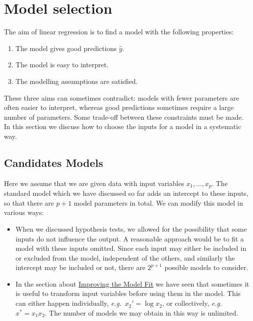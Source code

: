 \documentclass[
  a4paper,
]{article}
\providecommand{\tightlist}{%
  \setlength{\itemsep}{0pt}\setlength{\parskip}{0pt}}
\theoremstyle{definition}
\theoremstyle{definition}
\theoremstyle{definition}
\theoremstyle{definition}
\theoremstyle{remark}
\begin{document}
\clearpage

\hypertarget{S13-models}{%
\section{Model selection}\label{S13-models}}

The aim of linear regression is to find a model with the following
properties:

\begin{enumerate}
\def\labelenumi{\arabic{enumi}.}
\tightlist
\item
  The model gives good predictions \(\hat y\).
\item
  The model is easy to interpret.
\item
  The modelling assumptions are satisfied.
\end{enumerate}

These three aims can sometimes contradict: models with fewer parameters
are often easier to interpret, whereas good predictions sometimes require
a large number of parameters. Some trade-off
between these constraints must be made. In this section we discuss how
to choose the inputs for a model in a systematic way.

\hypertarget{candidates-models}{%
\subsection{Candidates Models}\label{candidates-models}}

Here we assume that we are given data with input variables \(x_1, \ldots, x_p\).
The standard model which we have discussed so far adds an intercept to these
inputs, so that there are \(p+1\) model parameters in total. We can modify
this model in various ways:

\begin{itemize}
\item
  When we discussed hypothesis tests, we allowed for the possibility that
  some inputs do not influence the output. A reasonable approach would
  be to fit a model with these inputs omitted. Since each input
  may either be included in or excluded from the model, independent of
  the others, and similarly the intercept may be included or not,
  there are \(2^{p+1}\) possible models to consider.
\item
  In the section about \protect\hyperlink{S11-improving}{Improving the Model Fit} we have seen that
  sometimes it is useful to transform input variables before using them
  in the model. This can either happen individually, \emph{e.g.}~\(x_2' = \log x_2\), or collectively, \emph{e.g.}~\(x^\ast = x_1 x_2\). The number of
  models we may obtain in this way is unlimited.
\end{itemize}
\end{document}
